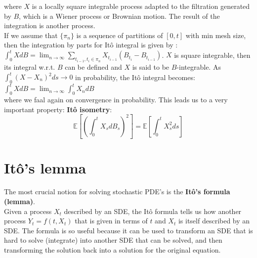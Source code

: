 \documentclass[a4paper]{report}
\begin{document}
\begin{itemize}
where $X$ is a locally square integrable process adapted to the filtration generated by $B$, which is a Wiener process or Brownian motion. The result of the integration is another process.\\

If we assume that  $\{\pi_n\}$ is a sequence of partitions of $[0,t]$ with min mesh size, then the integration by parts for Itô integral is given by :
\newline
\newline
$\int_0^t XdB = \lim_{n\to\infty} \sum_{t_{i-1},t_i \in \pi_n} X_{t_{i-1}}(B_{t_i}-B_{t_{i-1}})$.
\newline
\newline
$X$ is square integrable, then its integral w.r.t. $B$ can be defined and $X$ is said to be $B$-integrable. As $\int_0^t (X-X_n)^2ds \rightarrow 0$ in probability, the Itô integral becomes:\\

$\int_0^tXdB=\lim_{n\to\infty} \int_0^t X_ndB$\\

where we faal again on convergence in probability. This leads us to a very important property: \textbf{Itô isometry}:\\
\begin{equation}
\mathbb{E}[(\int_0^t X_sdB_s)^2] = \mathbb{E}[\int_0^t X_s^2ds]
\end{equation}


\section{Itô's lemma }

The most crucial notion for solving stochastic PDE's is the \textbf{Itô's formula (lemma)}.\\

Given a process $X_t$ described by an SDE, the Itô formula tells us how another process $Y_t = f(t, X_t)$ that is given in terms
of $t$ and $X_t$ is itself described by an SDE. The formula is so useful because
it can be used to transform an SDE that is hard to solve (integrate) into
another SDE that can be solved, and then transforming the solution back
into a solution for the original equation.\\



\end{itemize}
\end{document}
